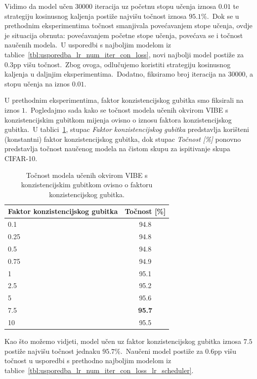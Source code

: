 \documentclass[diplomskirad]{fer}
\begin{document}
Vidimo da model učen $30000$ iteracija uz početnu stopu učenja iznosa $0.01$ te strategiju kosinusnog kaljenja postiže najvišu točnost iznosa $95.1\%$.\ 
Dok se u prethodnim eksperimentima točnost smanjivala povećavanjem stope učenja, ovdje je situacija obrnuta: povećavanjem početne stope učenja, povećava se i točnost naučenih modela.\ 
U usporedbi s najboljim modelom iz tablice~\ref{tbl:usporedba_lr_num_iter_con_loss}, novi najbolji model postiže za $0.3$pp višu točnost.\ 
Zbog ovoga, odlučujemo koristiti strategiju kosinusnog kaljenja u daljnjim eksperimentima.\ Dodatno, fiksiramo broj iteracija na $30000$, a stopu učenja na iznos $0.01$.\

U prethodnim eksperimentima, faktor konzistencijskog gubitka smo fiksirali na iznos $1$.\ Pogledajmo sada kako se točnost modela učenih okvirom VIBE s konzistencijskim gubitkom mijenja ovisno o iznosu faktora konzistencijskog gubitka.\ 
U tablici~\ref{tbl:usporedba_con_rate}, stupac \textit{Faktor konzistencijskog gubitka} predstavlja korišteni (konstantni) faktor konzistencijskog gubitka, dok stupac \textit{Točnost [\%]} ponovno predstavlja točnost naučenog modela na čistom skupu za ispitivanje skupa CIFAR-10.\ 

\begin{table}[htb]
  \caption{Točnost modela učenih okvirom VIBE s konzistencijskim gubitkom ovisno o faktoru konzistencijskog gubitka.}
  \label{tbl:usporedba_con_rate}
  \centering
  \begin{tabular}{l||c}
  Faktor konzistencijskog gubitka & Točnost [\%] \\ \hline \hline
  0.1 & 94.8 \\
  0.25 & 94.8 \\
  0.5 & 94.8 \\
  0.75 & 94.9 \\
  1 & 95.1 \\
  2.5 & 95.2 \\
  5 & 95.6 \\
  7.5 & \textbf{95.7} \\
  10 & 95.5 \\
  \end{tabular}
\end{table}

\pagebreak

Kao što možemo vidjeti, model učen uz faktor konzistencijskog gubitka iznosa $7.5$ postiže najvišu točnost jednaku $95.7\%$.\ 
Naučeni model postiže za $0.6$pp višu točnost u usporedbi s prethodno najboljim modelom iz tablice~\ref{tbl:usporedba_lr_num_iter_con_loss_lr_scheduler}.\ 
\end{document}
